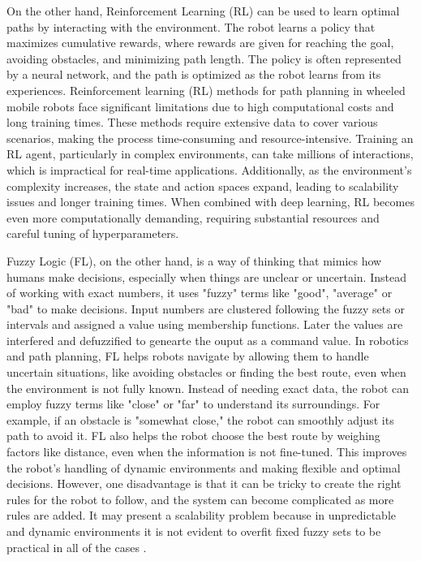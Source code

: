 On the other hand, Reinforcement Learning (RL) can be used to learn optimal paths by interacting with the environment. 
The robot learns a policy that maximizes cumulative rewards, where rewards are given for reaching the goal, avoiding 
obstacles, and minimizing path length. The policy is often represented by a neural network, and the path is optimized 
as the robot learns from its experiences. Reinforcement learning (RL) methods for path planning in wheeled mobile robots 
face significant limitations due to high computational costs and long training times. These methods require extensive 
data to cover various scenarios, making the process time-consuming and resource-intensive. Training an RL agent, 
particularly in complex environments, can take millions of interactions, which is impractical for real-time applications. 
Additionally, as the environment's complexity increases, the state and action spaces expand, 
leading to scalability issues and longer training times. When combined with deep learning, RL becomes even more 
computationally demanding, requiring substantial resources and careful tuning of hyperparameters.

Fuzzy Logic (FL), on the other hand, is a way of thinking that mimics how humans make decisions, especially when things are unclear 
or uncertain. Instead of working with exact numbers, it uses "fuzzy" terms like "good", "average" or "bad" to make 
decisions. Input numbers are clustered following the fuzzy sets or intervals and assigned a value using membership 
functions. Later the values are interfered and defuzzified to genearte the ouput as a command value. 
In robotics and path planning, FL helps robots navigate by allowing them to handle uncertain situations, 
like avoiding obstacles or finding the best route, even when the environment is not fully known. Instead of needing 
exact data, the robot can employ fuzzy terms like "close" or "far" to understand its surroundings. For example, if an 
obstacle is "somewhat close," the robot can smoothly adjust its path to avoid it. FL also helps the robot choose the best 
route by weighing factors like distance, even when the information is not fine-tuned. This improves the 
robot's handling of dynamic environments and making flexible and optimal decisions.
However, one 
disadvantage is that it can be tricky to create the right rules for the robot to follow, and the system can become 
complicated as more rules are added. It may present a scalability problem because in unpredictable and dynamic environments
it is not evident to overfit fixed fuzzy sets to be practical in all of the cases \cite{R12}.

